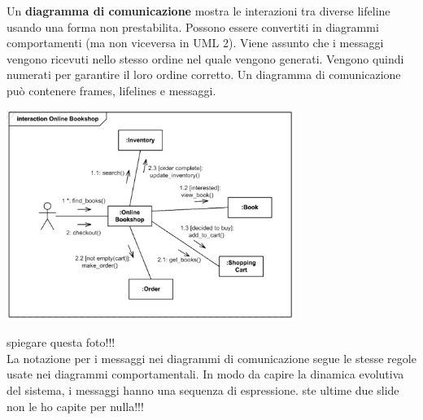 \documentclass{article}
\begin{document}
Un \textbf{diagramma di comunicazione} mostra le interazioni tra diverse lifeline usando una forma non prestabilita. Possono essere convertiti in diagrammi comportamenti (ma non viceversa in UML 2). Viene assunto che i messaggi vengono ricevuti nello stesso ordine nel quale vengono generati. Vengono quindi numerati per garantire il loro ordine corretto. Un diagramma di comunicazione può contenere frames, lifelines e messaggi.
\begin{center}
    \includegraphics[width=0.7\textwidth]{foto 15.png}
\end{center}
spiegare questa foto!!!\vspace{14pt}\\
La notazione per i messaggi nei diagrammi di comunicazione segue le stesse regole usate nei diagrammi comportamentali. In modo da capire la dinamica evolutiva del sistema, i messaggi hanno una sequenza di espressione.
ste ultime due slide non le ho capite per nulla!!!
\end{document}
